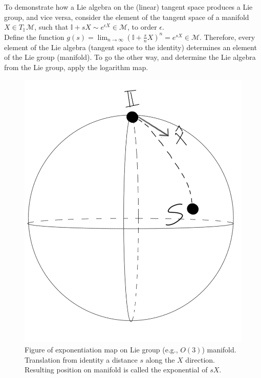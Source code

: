 \noindent To demonstrate how a Lie algebra on the (linear) tangent space produces a Lie group, and vice versa, consider the element of the tangent space of a manifold $X \in T_{\mathbb{I}} \, \mathcal{M}$, such that $\mathbb{I} + s X \sim e^{\epsilon X} \in \mathcal{M}$, to order $\epsilon$. \\

\noindent Define the function $g(s) = \lim_{n\to\infty} (\mathbb{I} + \frac{s}{n} X)^n = e^{s X} \in \mathcal{M}$. Therefore, every element of the Lie algebra (tangent space to the identity) determines an element of the Lie group (manifold). To go the other way, and determine the Lie algebra from the Lie group, apply the logarithm map.\\

\begin{figure}[H]
	\centering
	\includegraphics[scale=0.4]{exponentiation.png}
	\caption{Figure of exponentiation map on Lie group (e.g., $O(3)$) manifold. Translation from identity a distance $s$ along the $X$ direction. Resulting position on manifold is called the exponential of $s X$.}
\end{figure}

